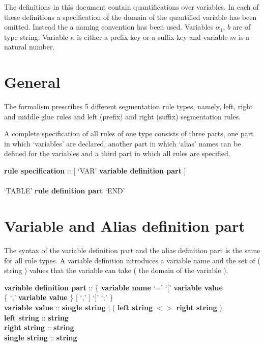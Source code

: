 The definitions in this document contain quantifications over variables. In
each of these definitions a specification of the domain of the quantified
variable has been omitted. Instead the a naming convention has been used.
Variables $\alpha_{1}$, $b$ are of type string. Variable $\kappa$
is either a prefix key or a suffix key and variable $m$ is a natural number.

\section{General}
The formalism prescribes 5 different segmentation rule types, namely,
left, right and middle glue rules and left (prefix) and right (suffix)
segmentation rules.

A complete specification of all rules of one type consists of three parts,
one part in which `variables' are declared, another part in which `alias' names
can be defined for the variables and a third part in which
all rules are specified.

\small
\begin{code}
{\bf rule specification} :: [ `VAR' {\bf variable definition part} ] \\
\>\>\> \\
\>\>\>\>`TABLE' {\bf rule definition part } `END' \\
\end{code}
\normalsize

\section{Variable and Alias definition part}

The syntax of the variable definition part and the alias definition part is
the same for all
rule types. A variable definition introduces a variable name and the set of
( string ) values that the variable can take ( the domain of the variable ).

\small
\begin{code}
{\bf variable definition part} :: \{ {\bf variable name} `=' `[' {\bf variable value } \\
\>\>\>\>\{ `,' {\bf variable value} \} [ `,' ] `]' `;' \}\\
{\bf variable value} :: {\bf single string} $|$ ( {\bf left string} $<>$ {\bf right string} )\\
{\bf left string} :: {\bf string} \\
{\bf right string} :: {\bf string} \\
{\bf single string} :: {\bf string} \\
\end{code}
\normalsize

